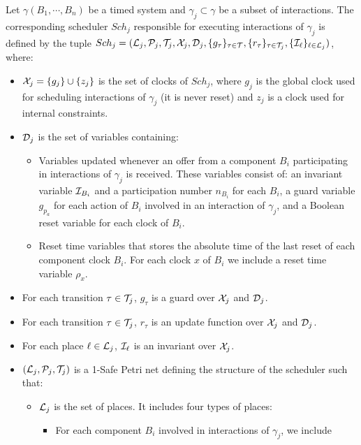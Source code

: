 \begin{definition}[Scheduler]\label{def:sch}
  Let $\gamma(B_1,\cdots,B_n)$ be a timed system and $\gamma_j\subset\gamma$ be a subset of
  interactions. The corresponding scheduler $Sch_j$ responsible for executing interactions
  of $\gamma_j$ is defined by the tuple  
  $Sch_j=(\mathcal{L}_j, \mathcal{P}_j,\mathcal{T}_j,\mathcal{X}_j, \mathcal{D}_j,\{g_{\tau}\}_{\tau\in\mathcal{T}},
  \{r_{\tau}\}_{\tau\in\mathcal{T}_j},\{\mathcal{I}_{\ell}\}_{\ell\in\mathcal{L}_j})$, where:
  \begin{itemize}
    \item $\mathcal{X}_j=\{g_j\}\cup\{z_j\}$ is the set of clocks of $Sch_j$, where $g_j$ is
      the global clock used for scheduling interactions of $\gamma_j$ (it is never reset)
      and $z_j$ is a clock used for internal constraints. 
    \item $\mathcal{D}_j$ is the set of variables containing:
      \begin{itemize}
        \item Variables updated whenever an offer from a component $B_i$ participating in 
          interactions of $\gamma_j$ is received. These variables consist of: an invariant
          variable $\mathcal{I}_{B_i}$ and a participation number $n_{B_i}$ for each $B_i$, 
          a guard variable $g_{p_a}$ for each action of $B_i$ involved in an interaction of 
          $\gamma_j$, and a Boolean reset variable for each clock of $B_i$.
        \item Reset time variables that stores the absolute time of the last reset of 
          each component clock $B_i$. For each clock $x$ of $B_i$ we include a reset time 
          variable $\rho_x$.
      \end{itemize}
    \item For each transition $\tau\in\mathcal{T}_j$, $g_{\tau}$ is a guard over 
      $\mathcal{X}_j$ and $\mathcal{D}_j$.
    \item For each transition $\tau\in\mathcal{T}_j$, $r_{\tau}$ is an update function over 
      $\mathcal{X}_j$ and $\mathcal{D}_j$.
    \item For each place $\ell\in\mathcal{L}_j$, $\mathcal{I}_{\ell}$ is an invariant over $\mathcal{X}_j$. 
    \item $(\mathcal{L}_j,\mathcal{P}_j,\mathcal{T}_j)$ is a 1-Safe Petri net defining 
      the structure of the scheduler such that:
      \begin{itemize}
        \item $\mathcal{L}_j$ is the set of places. It includes four types of places:
        \begin{itemize}
          \item For each component $B_i$ involved in interactions of $\gamma_j$, we include

\end{itemize}
\end{itemize}
\end{itemize}
\end{definition}
